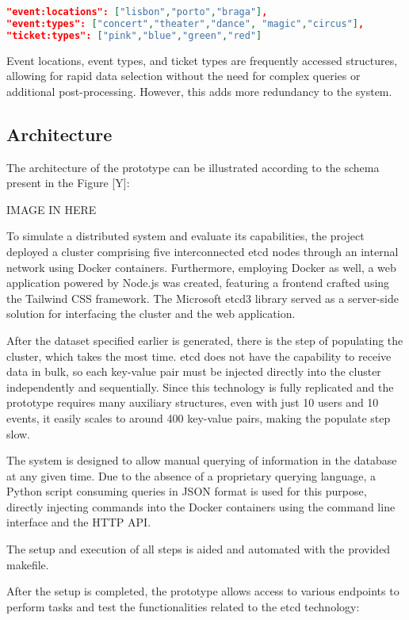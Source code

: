 \documentclass[screen,review]{acmart}
\begin{document}
\begin{lstlisting}[language=json]
"event:locations": ["lisbon","porto","braga"],
"event:types": ["concert","theater","dance", "magic","circus"],
"ticket:types": ["pink","blue","green","red"]
\end{lstlisting}

Event locations, event types, and ticket types are frequently accessed structures, allowing for rapid data selection without the need for complex queries or additional post-processing. However, this adds more redundancy to the system.

\subsection{Architecture}
The architecture of the prototype can be illustrated according to the schema present in the Figure [Y]:

IMAGE IN HERE

To simulate a distributed system and evaluate its capabilities, the project deployed a cluster comprising five interconnected etcd nodes through an internal network using Docker containers. Furthermore, employing Docker as well, a web application powered by Node.js was created, featuring a frontend crafted using the Tailwind CSS framework. The Microsoft etcd3 library served as a server-side solution for interfacing the cluster and the web application.

After the dataset specified earlier is generated, there is the step of populating the cluster, which takes the most time. etcd does not have the capability to receive data in bulk, so each key-value pair must be injected directly into the cluster independently and sequentially. Since this technology is fully replicated and the prototype requires many auxiliary structures, even with just 10 users and 10 events, it easily scales to around 400 key-value pairs, making the populate step slow.

The system is designed to allow manual querying of information in the database at any given time. Due to the absence of a proprietary querying language, a Python script consuming queries in JSON format is used for this purpose, directly injecting commands into the Docker containers using the command line interface and the HTTP API.

The setup and execution of all steps is aided and automated with the provided makefile.

After the setup is completed, the prototype allows access to various endpoints to perform tasks and test the functionalities related to the etcd technology:
\end{document}
